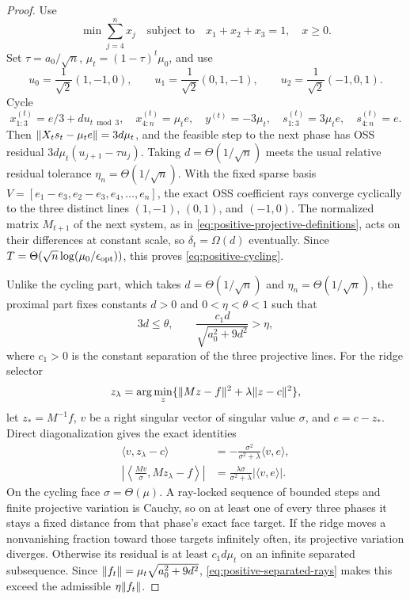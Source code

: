 \begin{proof}
Use
\[
 \min\sum_{j=4}^n x_j\quad\text{subject to}\quad
 x_1+x_2+x_3=1,\quad x\geq0.
\]
Set $\tau=a_0/\sqrt n$, $\mu_t=(1-\tau)^t\mu_0$, and use
\[
 u_0=\frac{1}{\sqrt2}(1,-1,0),\qquad
 u_1=\frac{1}{\sqrt2}(0,1,-1),\qquad
 u_2=\frac{1}{\sqrt2}(-1,0,1).
\]
Cycle
\[
 x_{1:3}^{(t)}=e/3+d u_{t\bmod3},\quad x_{4:n}^{(t)}=\mu_te,
 \quad y^{(t)}=-3\mu_t,
 \quad s_{1:3}^{(t)}=3\mu_te,\quad s_{4:n}^{(t)}=e.
\]
Then $\lVert X_ts_t-\mu_te\rVert=3d\mu_t$, and the feasible step to the next
phase has OSS residual $3d\mu_t(u_{j+1}-\tau u_j)$.  Taking
$d=\Theta(1/\sqrt n)$ meets the usual relative residual tolerance
$\eta_n=\Theta(1/\sqrt n)$.
With the fixed sparse basis
$V=[e_1-e_3,e_2-e_3,e_4,\ldots,e_n]$, the exact OSS coefficient rays converge
cyclically to the three distinct lines $(1,-1)$, $(0,1)$, and $(-1,0)$.
The normalized matrix $M_{t+1}$ of the next system, as in
\eqref{eq:positive-projective-definitions}, acts on their differences at
constant scale, so $\delta_t=\Omega(d)$ eventually.  Since
$T=\Theta(\sqrt n\log(\mu_0/\epsilon_{\rm opt}))$, this proves
\eqref{eq:positive-cycling}.

Unlike the cycling part, which takes $d=\Theta(1/\sqrt n)$ and
$\eta_n=\Theta(1/\sqrt n)$, the proximal part fixes constants $d>0$ and
$0<\eta<\theta<1$ such that
\begin{equation}
 3d\leq\theta,\qquad
 \frac{c_1d}{\sqrt{a_0^2+9d^2}}>\eta,                  \label{eq:positive-separated-rays}
\end{equation}
where $c_1>0$ is the constant separation of the three projective lines.
For the ridge selector
\[
 z_\lambda=\arg\min_z\{\lVert Mz-f\rVert^2+\lambda\lVert z-c\rVert^2\},
\]
let $z_*=M^{-1}f$, $v$ be a right singular vector of singular value $\sigma$,
and $e=c-z_*$.  Direct diagonalization gives the exact identities
\begin{align*}
 \langle v,z_\lambda-c\rangle
 &=-\frac{\sigma^2}{\sigma^2+\lambda}\langle v,e\rangle,\\
 \left|\left\langle \frac{Mv}{\sigma},Mz_\lambda-f\right\rangle\right|
 &=\frac{\lambda\sigma}{\sigma^2+\lambda}|\langle v,e\rangle|.
\end{align*}
On the cycling face $\sigma=\Theta(\mu)$.  A ray-locked sequence of bounded
steps and finite projective variation is Cauchy, so on at least one of every
three phases it stays a fixed distance from that phase's exact face target.
If the ridge moves a nonvanishing fraction toward those targets infinitely
often, its projective variation diverges.  Otherwise its residual is at least
$c_1d\mu_t$ on an infinite separated subsequence.  Since
$\lVert f_t\rVert=\mu_t\sqrt{a_0^2+9d^2}$,
\eqref{eq:positive-separated-rays} makes this exceed the admissible
$\eta\lVert f_t\rVert$.


\end{proof}
